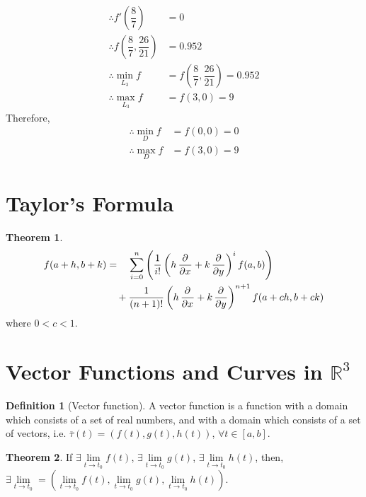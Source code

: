\documentclass[fleqn, a4paper, 12pt, twoside]{article}
\theoremstyle{definition}
\newtheorem{definition}{Definition}
\theoremstyle{theorem}
\newtheorem{theorem}{Theorem}
\begin{document}
{\begin{solution}
\begin{align*}
		\therefore f'\left(\dfrac{8}{7}\right)                & = 0                                                                              \\
		\therefore f\left(\dfrac{8}{7}, \dfrac{26}{21}\right) & = 0.952                                                                          \\
		\therefore \min_{L_3} f                               & = f\left(\dfrac{8}{7}, \dfrac{26}{21}\right) = 0.952                             \\
		\therefore \max_{L_3} f                               & = f(3,0) = 9
	\end{align*}
	Therefore,
	\begin{align*}
		\therefore \min_{D} f &= f(0,0) = 0\\
		\therefore \max_{D} f &= f(3,0) = 9
	\end{align*}
\end{solution}

\section{Taylor's Formula}

\begin{theorem}
	\begin{align*}
		f(a + h, b + k) & = \quad \sum\limits_{i = 0}^{n} \left( \frac{1}{i!} \left( h \dpd{}{x} + k \dpd{}{y} \right)^i f(a,b) \right) \\
                                & \quad+ \frac{1}{(n + 1)!} \left( h \dpd{}{x} + k \dpd{}{y} \right)^{n + 1} f(a + c h, b + c k)
	\end{align*}
	where $0 < c < 1$.
	\label{Taylor's_Formula_for_2_variables}
\end{theorem}

\section{Vector Functions and Curves in $\mathbb{R}^3$}

\begin{definition}[Vector function]
	A vector function is a function with a domain which consists of a set of real numbers, and with a domain which consists of a set of vectors, i.e. $\overline{\tau}(t) = \left( f(t), g(t), h(t) \right)$, $\forall t \in [a,b]$.
\end{definition}

\begin{theorem}
	If $\exists \lim\limits_{t \to t_0} f(t)$, $\exists \lim\limits_{t \to t_0} g(t)$, $\exists \lim\limits_{t \to t_0} h(t)$, then, $\exists \lim\limits_{t \to t_0} = \left( \lim\limits_{t \to t_0} f(t), \lim\limits_{t \to t_0} g(t), \lim\limits_{t \to t_0} h(t) \right)$.
\end{theorem}

}
\end{document}
